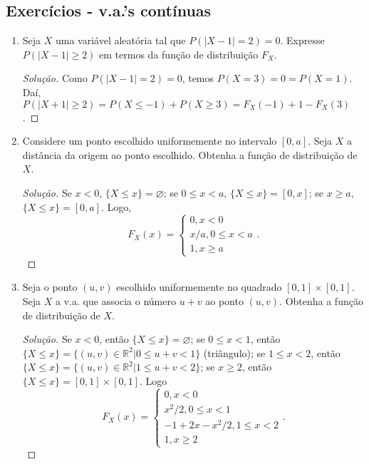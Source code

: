 \documentclass[../Notas.tex]{subfiles}
\begin{document}
\subsection{Exercícios - v.a.'s contínuas}

\begin{enumerate}
    \item Seja $X$ uma variável aleatória tal que $P(|X - 1| = 2) = 0$. Expresse $P(|X - 1| \geq 2)$ em termos da função de distribuição $F_X$.
    \begin{proof}[Solução]
        Como $P(|X-1|=2) = 0$, temos $P(X=3) = 0 = P(X=1)$. Daí, $P(|X+1|\geq 2) = P(X\leq -1) + P(X\geq 3)
        = F_X(-1) + 1 - F_X(3)$.
    \end{proof}
    \item Considere um ponto escolhido uniformemente no intervalo $[0, a]$. Seja $X$ a distância da origem ao ponto escolhido. Obtenha a função de distribuição de $X$.
    \begin{proof}[Solução]
        Se $x<0$, $\{X\leq x\} = \varnothing$; se $0\leq x<a$, $\{X\leq x\} = [0,x]$; se $x\geq a$,
        $\{X\leq x\} = [0,a]$. Logo,
        \[
        F_X(x) = \begin{cases}
        0, x<0 \\
        x/a, 0\leq x < a \\
        1, x\geq a
        \end{cases}.
        \]
    \end{proof}
    \item Seja o ponto $(u, v)$ escolhido uniformemente no quadrado $[0, 1] \times [0, 1]$. Seja $X$ a v.a. que associa o número $u + v$ ao ponto $(u, v)$. Obtenha a função de distribuição de $X$.
    \begin{proof}[Solução]
        Se $x<0$, então $\{X\leq x\} = \varnothing$; se $0\leq x<1$, então $\{X\leq x\} = 
        \{(u,v)\in\mathbb{R}^2 | 0\leq u+v< 1\}$ (triângulo); se $1\leq x<2$, então
        $\{X\leq x\} = \{(u,v)\in\mathbb{R}^2 | 1 \leq u+v<2\}$; se $x\geq 2$, então 
        $\{X\leq x\} = [0,1]\times[0,1]$. Logo
        \[
        F_X(x) = \begin{cases}
        0, x<0 \\
        x^2/2, 0\leq x<1 \\
        -1+2x-x^2/2, 1\leq x < 2 \\
        1, x\geq 2
        \end{cases}.
        \]
    \end{proof}

\end{enumerate}
\end{document}
